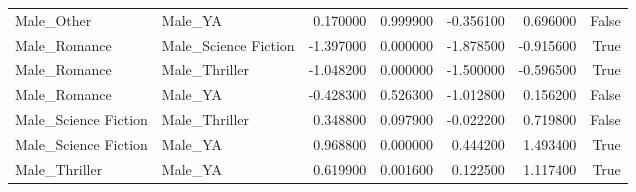 \begin{tabular}{llrrrrr}
Male_Other & Male_YA & 0.170000 & 0.999900 & -0.356100 & 0.696000 & False \\
Male_Romance & Male_Science Fiction & -1.397000 & 0.000000 & -1.878500 & -0.915600 & True \\
Male_Romance & Male_Thriller & -1.048200 & 0.000000 & -1.500000 & -0.596500 & True \\
Male_Romance & Male_YA & -0.428300 & 0.526300 & -1.012800 & 0.156200 & False \\
Male_Science Fiction & Male_Thriller & 0.348800 & 0.097900 & -0.022200 & 0.719800 & False \\
Male_Science Fiction & Male_YA & 0.968800 & 0.000000 & 0.444200 & 1.493400 & True \\
Male_Thriller & Male_YA & 0.619900 & 0.001600 & 0.122500 & 1.117400 & True \\
\bottomrule
\end{tabular}
